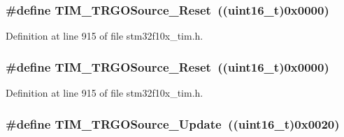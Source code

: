 \subsubsection[{\texorpdfstring{T\+I\+M\+\_\+\+T\+R\+G\+O\+Source\+\_\+\+Reset}{TIM_TRGOSource_Reset}}]{\setlength{\rightskip}{0pt plus 5cm}\#define T\+I\+M\+\_\+\+T\+R\+G\+O\+Source\+\_\+\+Reset~(({\bf uint16\+\_\+t})0x0000)}\hypertarget{group___t_i_m___trigger___output___source_gafb039ed39279a4d1134b234797b1cdfb}{}\label{group___t_i_m___trigger___output___source_gafb039ed39279a4d1134b234797b1cdfb}


Definition at line 915 of file stm32f10x\+\_\+tim.\+h.

\subsubsection[{\texorpdfstring{T\+I\+M\+\_\+\+T\+R\+G\+O\+Source\+\_\+\+Reset}{TIM_TRGOSource_Reset}}]{\setlength{\rightskip}{0pt plus 5cm}\#define T\+I\+M\+\_\+\+T\+R\+G\+O\+Source\+\_\+\+Reset~(({\bf uint16\+\_\+t})0x0000)}\hypertarget{group___t_i_m___trigger___output___source_gafb039ed39279a4d1134b234797b1cdfb}{}\label{group___t_i_m___trigger___output___source_gafb039ed39279a4d1134b234797b1cdfb}


Definition at line 915 of file stm32f10x\+\_\+tim.\+h.

\subsubsection[{\texorpdfstring{T\+I\+M\+\_\+\+T\+R\+G\+O\+Source\+\_\+\+Update}{TIM_TRGOSource_Update}}]{\setlength{\rightskip}{0pt plus 5cm}\#define T\+I\+M\+\_\+\+T\+R\+G\+O\+Source\+\_\+\+Update~(({\bf uint16\+\_\+t})0x0020)}\hypertarget{group___t_i_m___trigger___output___source_ga8a73c717070ab1a0ef90326780f20aef}{}\label{group___t_i_m___trigger___output___source_ga8a73c717070ab1a0ef90326780f20aef}


